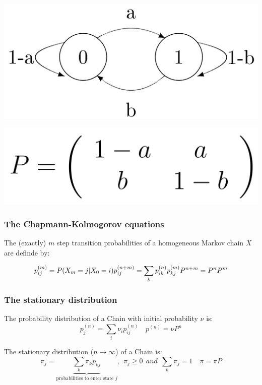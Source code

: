\begin{minipage}{0.4\textwidth}
\includegraphics[width=0.8\linewidth]{./Content/Markov/statediag}
\end{minipage}
\begin{minipage}{0.4\textwidth}
\includegraphics[width=0.8\linewidth]{./Content/Markov/statetab}
\end{minipage}
\hfill


\subsubsection{The Chapmann-Kolmogorov equations }
The (exactly) $m$ step transition probabilities of a homogeneous Markov chain $X$ are definde by: 

\begin{equation}
	p_{ij}^{(m)}=P(X_m=j|X_0=i)	\\ 
	p_{ij}^{(n+m)}=\sum\limits_k{p_{ik}^{(n)}p_{kj}^{(m)}}\\
	P^{n+m}=P^nP^m\nonumber
\end{equation}


\subsubsection{The stationary distribution }

The probability distribution of a Chain with initial probability $\nu$ is:
\begin{equation}
	\boxed{p_{j}^{(n)}=\sum\limits_i{\nu_i p_{ij}^{(n)}}} \quad
	\boxed{p^{(n)}=\nu P^{n}}
\end{equation}

The stationary distribution ($n\rightarrow \infty$) of a Chain is:
\begin{equation}
	\boxed{\pi_{j}=\underbrace{\sum\limits_k{\pi_k p_{kj}}}_{\text{probabilities to enter state }j},~~ \pi_j\geq 0 ~~ and ~~ \sum\limits_k{\pi_j}=1}\nonumber \quad
	\boxed{\pi=\pi P}
\end{equation}

